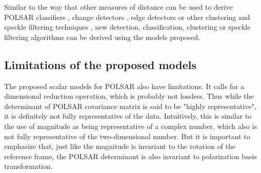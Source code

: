 Similar to the way that other measures of distance can be used to derive POLSAR classifiers \cite{Lee_1999_TGRS}, change detectors \cite{Conradsen_2003_TGRS_4}, edge detectors \cite{Schou_2003_TGRS_20} or other clustering and speckle filtering techniques \cite{Le_2010_ACRS} \cite{Le_2011_ACRS}, 
new detection, classification, clustering or speckle filtering algorithms can be derived using the models proposed.


\subsection{Limitations of the proposed models}


The
                proposed scalar models for POLSAR also have limitations.
It
                calls for a dimensional reduction operation, which is
                probably not lossless.
Thus
                while the determinant of POLSAR covariance matrix is
                said to be "highly representative", it is definitely not
                fully representative of the data.
Intuitively,
                this is similar to the use of magnitude as being
                representative of a complex number, which also is not
                fully representative of the two-dimensional number.
But it is important to emphasize that,
                just like the magnitude is invariant to the rotation of
                the reference frame, the POLSAR determinant is also
                invariant to polarization basis transformation.

